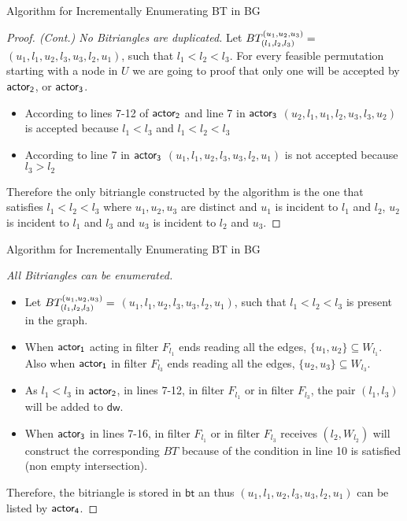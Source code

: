 \begin{frame}[fragile]{Algorithm for Incrementally Enumerating BT in BG}
  \begin{proof}[Proof. (Cont.) No Bitriangles are duplicated]   
  Let $BT_{(l_1, l_2,l_3)}^{(u_1, u_2, u_3)} =$  $(u_1,l_1,u_2,l_3,u_3,l_2,u_1)$, such that $l_1 < l_2 <l_3$. For every feasible permutation  starting with a node in $U$ we are going to proof that only one will be accepted by $\mathsf{actor_2}$, or $\mathsf{actor_3}$.  
  \begin{itemize}
        \item According to lines 7-12 of $\mathsf{actor_2}$ and line 7 in $\mathsf{actor_3}$ $(u_2,l_1,u_1,l_2,u_3,l_3,u_2)$ is accepted because $l_1 < l_3 $ and $l_1 < l_2 <l_3$ 
        \item According to  line 7 in $\mathsf{actor_3}$ $(u_1, l_1,u_2,l_3,u_3,l_2,u_1)$ is not accepted because $l_3 > l_2$
  \end{itemize}
  Therefore the  only bitriangle  constructed by the algorithm is the one that satisfies $l_1 < l_2 < l_3$ where $u_1,u_2,u_3$  are distinct and $u_1$ is incident to $l_1$ and $l_2$, $u_2$ is incident to $l_1$ and $l_3$ and $u_3$ is incident to $l_2$ and $u_3$.
  \end{proof}  
\end{frame}


\begin{frame}[fragile]{Algorithm for Incrementally Enumerating BT in BG}
  \begin{proof}[All Bitriangles can be enumerated] 
    \begin{itemize}
      \item Let $BT_{(l_1, l_2,l_3)}^{(u_1, u_2, u_3)} =$  $(u_1,l_1,u_2,l_3,u_3,l_2,u_1)$, such that $l_1 < l_2 <l_3$ is present in the graph. 
      \item When $\mathsf{actor_1}$ acting in filter $F_{l_1}$ ends reading all the edges, $\{u_1,u_2\} \subseteq W_{l_1}$. Also when $\mathsf{actor_1}$ in filter $F_{l_3}$ ends reading all the edges, $\{u_2,u_3\} \subseteq W_{l_3}$. 
      \item As $l_1 < l_3$ in $\mathsf{actor_2}$, in lines 7-12, in filter $F_{l_1}$ or in filter $F_{l_3}$, the pair $(l_1,l_3)$  will be added to $\mathsf{dw}$.
      \item When $\mathsf{actor_3}$ in lines 7-16, in filter $F_{l_1}$ or in filter $F_{l_3}$ receives $(l_2, W_{l_2})$  will construct the corresponding  $BT$ because of the condition in line 10 is satisfied (non empty intersection). 
    \end{itemize}    
    Therefore, the bitriangle is stored in $\mathsf{bt}$ an thus $(u_1,l_1,u_2,l_3,u_3,l_2,u_1)$ can be listed by $\mathsf{actor_4}$.
  \end{proof}
  
\end{frame} 
\fi

